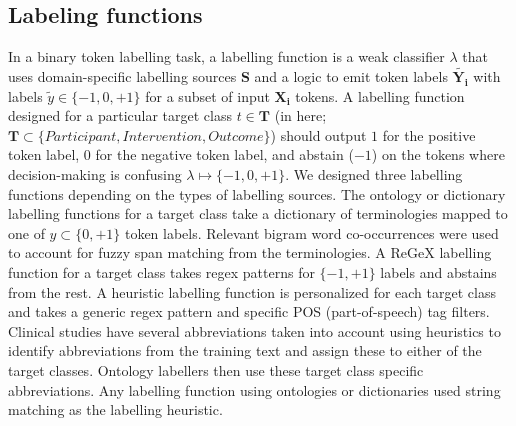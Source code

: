 \documentclass[10.7pt,]{article}
\begin{document}
\subsection{Labeling functions}\label{lfs}
%
In a binary token labelling task, a labelling function is a weak classifier $\lambda$ that uses domain-specific labelling sources $\bm{S}$ and a logic to emit token labels $ \widetilde{\bm{Y_{i}}}$ with labels $ \widetilde{y} \in \{-1, 0, +1\}$ for a subset of input $\bm{X_{i}}$ tokens.
A labelling function designed for a particular target class $t \in \bm{T}$ (in here; $\bm{T} \subset \{ Participant, Intervention, Outcome \} $) should output  $1$ for the positive token label, $0$ for the negative token label, and abstain ($-1$) on the tokens where decision-making is confusing $\lambda \mapsto \{-1, 0, +1\}$.
We designed three labelling functions depending on the types of labelling sources.
The ontology or dictionary labelling functions for a target class take a dictionary of terminologies mapped to one of $y \subset \{0, +1\} $ token labels.
Relevant bigram word co-occurrences were used to account for fuzzy span matching from the terminologies.
A ReGeX labelling function for a target class takes regex patterns for $\{-1, +1\}$ labels and abstains from the rest.
A heuristic labelling function is personalized for each target class and takes a generic regex pattern and specific POS (part-of-speech) tag filters.
Clinical studies have several abbreviations taken into account using heuristics to identify abbreviations from the training text and assign these to either of the target classes. 
Ontology labellers then use these target class specific abbreviations.
Any labelling function using ontologies or dictionaries used string matching as the labelling heuristic.
%
%
%
\end{document}
